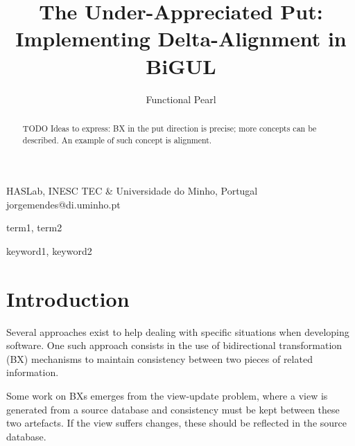 \documentclass[preprint,numbers]{sigplanconf}
\newif\ifanonymous
\newcommand{\TODO}[1]{{\color{black!10!blue}TODO #1}}
\begin{document}
\setlength{\pdfpageheight}{\paperheight}
\setlength{\pdfpagewidth}{\paperwidth}




\title{The Under-Appreciated Put: Implementing Delta-Alignment in BiGUL}
\subtitle{Functional Pearl}

\ifanonymous
\authorinfo{}{}{}
\else
{}
           {HASLab, INESC TEC \& Universidade do Minho, Portugal}
           {jorgemendes@di.uminho.pt}
\fi

\maketitle

\begin{abstract}
  \TODO{Ideas to express: BX in the put direction is precise; more concepts can
  be described. An example of such concept is alignment.}
\end{abstract}


\terms
term1, term2

\keywords
keyword1, keyword2


\section{Introduction}

Several approaches exist to help dealing with specific situations when
developing software. One such approach consists in the use of bidirectional
transformation (BX) mechanisms to maintain consistency between two pieces of
related information.

Some work on BXs emerges from the view-update problem, where a view is generated
from a source database and consistency must be kept between these two artefacts.
If the view suffers changes, these should be reflected in the source database.
\end{document}
